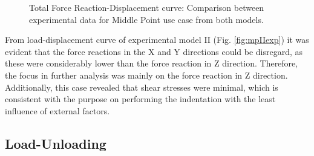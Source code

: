 \begin{figure}%
    \centering
   \qquad
   \caption{Total Force Reaction-Displacement curve: Comparison between experimental data for Middle Point use case from both models.}%
   \label{fig:midpointexpIvsexpII}%
\end{figure}

From load-displacement curve of experimental model II (Fig. \ref{fig:mpIIexp}) it was evident that the
force reactions in the X and Y directions could be disregard, as these were considerably lower than
the force reaction in Z direction. Therefore, the focus in further analysis was mainly 
on the force reaction in Z direction. Additionally, this case revealed that shear stresses were minimal, 
which is consistent with the purpose on performing the indentation with the least influence of external factors.

\subsection*{Load-Unloading}
\label{subsection:loadunloadresult}


